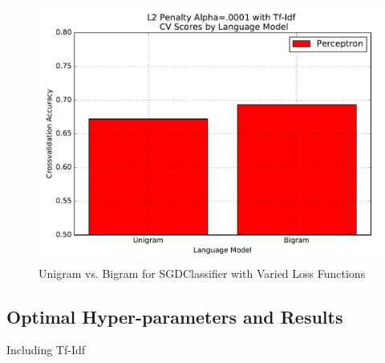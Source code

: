 \documentclass[a4paper, 12pt]{article}
\begin{document}
\begin{figure}[!htb]
  \includegraphics[width=\linewidth]{FiguresSVM_bigram_perceptron.pdf}
\endminipage
\caption[Unigram vs. Bigram for SGDClassifier with Varied Loss Functions]{Unigram vs. Bigram for SGDClassifier with Varied Loss Functions}
\label{fig: lm}
\end{figure}
\subsection{Optimal Hyper-parameters and Results}
Including Tf-Idf


\end{document}
